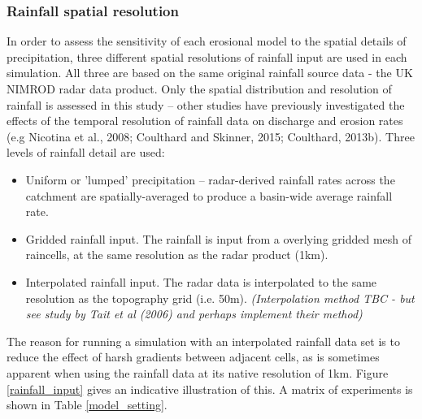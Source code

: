 \documentclass[12pt,oneside,PhD]{muthesis}
\begin{document}

\subsubsection{Rainfall spatial resolution}
In order to assess the sensitivity of each erosional model to the spatial details of precipitation, three different spatial resolutions of rainfall input are used in each simulation. All three are based on the same original rainfall source data - the UK NIMROD radar data product. Only the spatial distribution and resolution of rainfall is assessed in this study -- other studies have previously investigated the effects of the temporal resolution of rainfall data on discharge and erosion rates (e.g Nicotina et al., 2008; Coulthard and Skinner, 2015; Coulthard, 2013b). Three levels of rainfall detail are used: 

\begin{itemize}
\item Uniform or 'lumped' precipitation -- radar-derived rainfall rates across the catchment are spatially-averaged to produce a basin-wide average rainfall rate.  
\item Gridded rainfall input. The rainfall is input from a overlying gridded mesh of raincells, at the same resolution as the radar product (1km).
\item Interpolated rainfall input. The radar data is interpolated to the same resolution as the topography grid (i.e. 50m). \textit{(Interpolation method TBC - but see study by Tait et al (2006) and perhaps implement their method) }
\end{itemize}

The reason for running a simulation with an interpolated rainfall data set is to reduce the effect of harsh gradients between adjacent cells, as is sometimes apparent when using the rainfall data at its native resolution of 1km. Figure \ref{rainfall_input} gives an indicative illustration of this. A matrix of experiments is shown in Table \ref{model_setting}.
\end{document}
